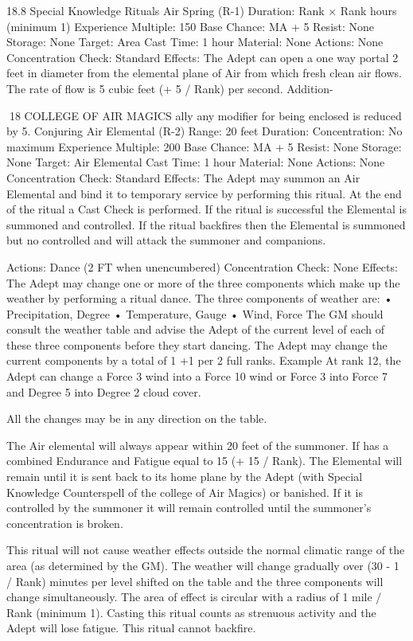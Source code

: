 \documentclass[a4paper]{article}
\begin{document}
\begin{multicols}{3}
18.8 Special Knowledge Rituals
Air Spring (R-1)
Duration: Rank × Rank hours (minimum 1)
Experience Multiple: 150
Base Chance: MA + 5%
Resist: None
Storage: None
Target: Area
Cast Time: 1 hour
Material: None
Actions: None
Concentration Check: Standard
Effects: The Adept can open a one way portal 2
feet in diameter from the elemental plane of Air
from which fresh clean air flows. The rate of flow
is 5 cubic feet (+ 5 / Rank) per second. Addition-

18 COLLEGE OF AIR MAGICS
ally any modifier for being enclosed is reduced by
5.
Conjuring Air Elemental (R-2)
Range: 20 feet
Duration: Concentration: No maximum
Experience Multiple: 200
Base Chance: MA + 5%
Resist: None
Storage: None
Target: Air Elemental
Cast Time: 1 hour
Material: None
Actions: None
Concentration Check: Standard
Effects: The Adept may summon an Air Elemental
and bind it to temporary service by performing this
ritual. At the end of the ritual a Cast Check is performed. If the ritual is successful the Elemental is
summoned and controlled. If the ritual backfires
then the Elemental is summoned but no controlled
and will attack the summoner and companions.

Actions: Dance (2 FT when unencumbered)
Concentration Check: None
Effects: The Adept may change one or more of the
three components which make up the weather by
performing a ritual dance. The three components of
weather are:
• Precipitation, Degree
• Temperature, Gauge
• Wind, Force
The GM should consult the weather table and
advise the Adept of the current level of each of
these three components before they start dancing.
The Adept may change the current components by
a total of 1 +1 per 2 full ranks.
Example
At rank 12, the Adept can change a Force 3
wind into a Force 10 wind or Force 3 into Force 7 and
Degree 5 into Degree 2 cloud cover.

All the changes may be in any direction on the
table.

The Air elemental will always appear within 20
feet of the summoner. If has a combined Endurance and Fatigue equal to 15 (+ 15 / Rank). The
Elemental will remain until it is sent back to its
home plane by the Adept (with Special Knowledge
Counterspell of the college of Air Magics) or banished. If it is controlled by the summoner it will
remain controlled until the summoner’s concentration is broken.

This ritual will not cause weather effects outside
the normal climatic range of the area (as determined by the GM). The weather will change
gradually over (30 - 1 / Rank) minutes per level
shifted on the table and the three components will
change simultaneously. The area of effect is circular with a radius of 1 mile / Rank (minimum 1).
Casting this ritual counts as strenuous activity and
the Adept will lose fatigue. This ritual cannot backfire.


\end{multicols}
\end{document}
